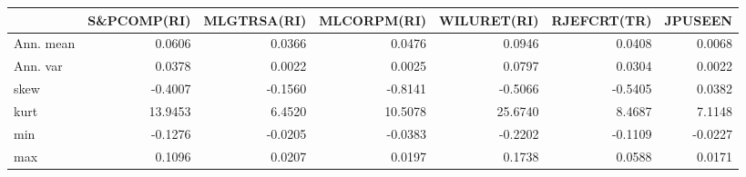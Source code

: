 \begin{tabular}{lrrrrrr}
\toprule
{} &  S\&PCOMP(RI) &  MLGTRSA(RI) &  MLCORPM(RI) &  WILURET(RI) &  RJEFCRT(TR) &  JPUSEEN \\
\midrule
Ann. mean &       0.0606 &       0.0366 &       0.0476 &       0.0946 &       0.0408 &   0.0068 \\
Ann. var  &       0.0378 &       0.0022 &       0.0025 &       0.0797 &       0.0304 &   0.0022 \\
skew      &      -0.4007 &      -0.1560 &      -0.8141 &      -0.5066 &      -0.5405 &   0.0382 \\
kurt      &      13.9453 &       6.4520 &      10.5078 &      25.6740 &       8.4687 &   7.1148 \\
min       &      -0.1276 &      -0.0205 &      -0.0383 &      -0.2202 &      -0.1109 &  -0.0227 \\
max       &       0.1096 &       0.0207 &       0.0197 &       0.1738 &       0.0588 &   0.0171 \\
\bottomrule
\end{tabular}
